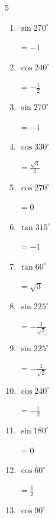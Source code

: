 \begin{multicols}{5}
\begin{enumerate}
        $\displaystyle =0$

  \item $\displaystyle \sin{270^\circ}$

        $\displaystyle =-1$

  \item $\displaystyle \cos{240^\circ}$

        $\displaystyle =-\frac{1}{2}$

  \item $\displaystyle \sin{270^\circ}$

        $\displaystyle =-1$

  \item $\displaystyle \cos{330^\circ}$

        $\displaystyle =\frac{\sqrt{3}}{2}$

  \item $\displaystyle \cos{270^\circ}$

        $\displaystyle =0$

  \item $\displaystyle \tan{315^\circ}$

        $\displaystyle =-1$

  \item $\displaystyle \tan{60^\circ}$

        $\displaystyle =\sqrt{3}$

  \item $\displaystyle \sin{225^\circ}$

        $\displaystyle =-\frac{1}{\sqrt{2}}$

  \item $\displaystyle \sin{225^\circ}$

        $\displaystyle =-\frac{1}{\sqrt{2}}$

  \item $\displaystyle \cos{240^\circ}$

        $\displaystyle =-\frac{1}{2}$

  \item $\displaystyle \sin{180^\circ}$

        $\displaystyle =0$

  \item $\displaystyle \cos{60^\circ}$

        $\displaystyle =\frac{1}{2}$

\columnbreak %

  \item $\displaystyle \cos{90^\circ}$


\end{enumerate}
\end{multicols}
